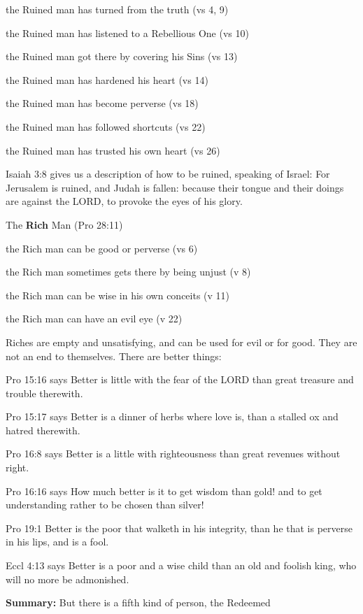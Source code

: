 \begin{compactenum}[I.]
    \begin{compactenum}[A.]
    	\item the Ruined man has turned from the truth (vs 4, 9)
    	\item the Ruined man has listened to a Rebellious One (vs 10)
    	\item the Ruined man got there by covering his Sins (vs 13)
    	\item the Ruined man has hardened his heart (vs 14)
    	\item the Ruined man has become perverse (vs 18)
    	\item the Ruined man has followed shortcuts (vs 22)
    	\item the Ruined man has trusted his own heart (vs 26)\newline
	\end{compactenum}
Isaiah 3:8 gives us a description of how to be ruined, speaking of Israel: For Jerusalem is ruined, and Judah is fallen: because their tongue and their doings are against the LORD, to provoke the eyes of his glory.
    \item The \textbf{Rich} Man (Pro 28:11) 
    \begin{compactenum}[A.]
    	\item the Rich man can be good or perverse (vs 6)
    	\item the Rich man sometimes gets there by being unjust (v 8)
    	\item the Rich man can be wise in his own conceits (v 11)
    	\item the Rich man can have an evil eye (v 22)
	\end{compactenum}
Riches are empty and unsatisfying, and can be used for evil or for good. They are not an end to themselves. There are better things:
    \begin{compactenum}[A.]
    	\item Pro 15:16 says Better is little with the fear of the LORD than great treasure and trouble therewith.
    	\item Pro 15:17 says Better is a dinner of herbs where love is, than a stalled ox and hatred therewith.
    	\item Pro 16:8 says Better is a little with righteousness than great revenues without right.
    	\item Pro 16:16 says How much better is it to get wisdom than gold! and to get understanding rather to be chosen than silver! 
    	\item Pro 19:1 Better is the poor that walketh in his integrity, than he that is perverse in his lips, and is a fool.
    	\item Eccl 4:13 says Better is a poor and a wise child than an old and foolish king, who will no more be admonished.
	\end{compactenum}

\end{compactenum}
\textbf{Summary:} But there is a fifth kind of person, the Redeemed
